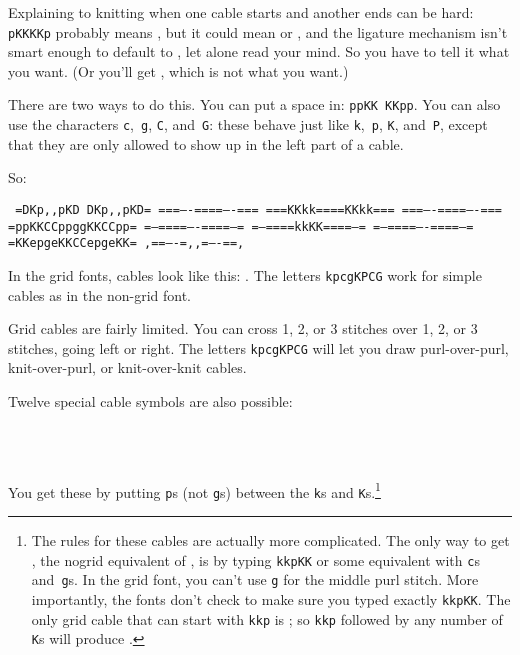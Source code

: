 \documentclass[draft]{amsart}
\begin{document}
Explaining to \textsf{knitting} when one cable starts and another ends can be hard: \texttt{pKKKKp} probably means , but it could mean  or , and the ligature mechanism isn't smart enough to default to , let alone read your mind. So you have to tell it what you want. (Or you'll get , which is not what you want.)

There are two ways to do this. You can put a space in: \texttt{ppKK KKpp}. You can also use the characters \texttt{c},~\texttt{g}, \texttt{C}, and~\texttt{G}: these behave just like \texttt{k},~\texttt{p}, \texttt{K}, and~\texttt{P}, except that they are only allowed to show up in the left part of a cable.

So: 
\begin{center}
\begin{minipage}[b]{108pt}
\obeylines\parindent=0pt\tt 
=DKp,,pKD DKp,,pKD=
===----====----===
===KKkk====KKkk===
===----====----===
=ppKKCCppggKKCCpp=
=--====----====--=
=--====kkKK====--=
=--====----====--=
=KKepgeKKCCepgeKK=
,==----=,,=----==,
\end{minipage}
\quad
\begin{minipage}[t]{224pt}
\end{minipage}
\end{center}

\knitgrid

In the grid fonts, cables look like this: . The letters \texttt{kpcgKPCG} work for simple cables as in the non-grid font.

Grid cables are fairly limited. You can cross 1, 2, or 3 stitches over 1, 2, or 3 stitches, going left or right. The letters \texttt{kpcgKPCG} will let you draw purl-over-purl, knit-over-purl, or knit-over-knit cables.

Twelve special cable symbols are also possible:
\begin{center}
\\
\\
\end{center}
You get these by putting \texttt{p}s (not \texttt{g}s) between the \texttt{k}s and \texttt{K}s.\footnote{{The rules for these cables are actually more complicated. The only way to get \knitnogrid{}, the nogrid equivalent of \knitgrid{}, is by typing \texttt{kkpKK} or some equivalent with \texttt{c}s and~\texttt{g}s. In the grid font, you can't use \texttt{g} for the middle purl stitch. More importantly, the fonts don't check to make sure you typed exactly \texttt{kkpKK}. The only grid cable that can start with \texttt{kkp} is ; so \texttt{kkp} followed by any number of \texttt{K}s will produce .}}
\end{document}
